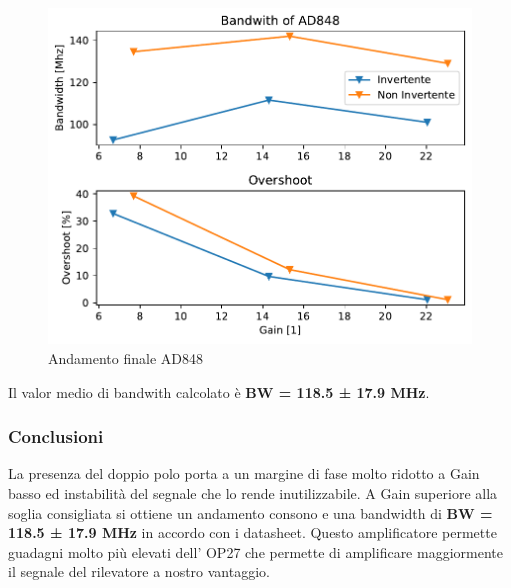 \begin{figure}[!h]
    \centering
    \includegraphics[width=0.5\linewidth]{assets/AD848/AD848_dati_tot.pdf}
    \caption{Andamento finale AD848 }
\end{figure}

Il valor medio di bandwith calcolato è \textbf{BW = 118.5 ± 17.9 MHz}.

\subsubsection{Conclusioni}
La presenza del doppio polo porta a un margine di fase molto ridotto a Gain basso ed instabilità del segnale che lo rende inutilizzabile. A Gain superiore alla soglia consigliata si ottiene un andamento consono e una bandwidth di \textbf{BW = 118.5 ± 17.9 MHz} in accordo con i datasheet.
Questo amplificatore permette guadagni molto più elevati dell' OP27 che permette di amplificare maggiormente il segnale del rilevatore a nostro vantaggio.